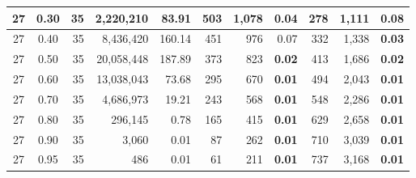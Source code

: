 \begin{table}[H]
\begin{tabular}{|c|c|r|r|r|r|r|r|r|r|r|}
        27                              & 0.30                              & 35                                     & 2,220,210                         & 83.91                             & 503           & 1,078            & \textbf{0.04} & 278           & 1,111            & 0.08          \\ \hline
        27                              & 0.40                              & 35                                     & 8,436,420                         & 160.14                            & 451           & 976              & 0.07          & 332           & 1,338            & \textbf{0.03} \\ \hline
        27                              & 0.50                              & 35                                     & 20,058,448                        & 187.89                            & 373           & 823              & \textbf{0.02} & 413           & 1,686            & \textbf{0.02} \\ \hline
        27                              & 0.60                              & 35                                     & 13,038,043                        & 73.68                             & 295           & 670              & \textbf{0.01} & 494           & 2,043            & \textbf{0.01} \\ \hline
        27                              & 0.70                              & 35                                     & 4,686,973                         & 19.21                             & 243           & 568              & \textbf{0.01} & 548           & 2,286            & \textbf{0.01} \\ \hline
        27                              & 0.80                              & 35                                     & 296,145                           & 0.78                              & 165           & 415              & \textbf{0.01} & 629           & 2,658            & \textbf{0.01} \\ \hline
        27                              & 0.90                              & 35                                     & 3,060                             & 0.01                              & 87            & 262              & \textbf{0.01} & 710           & 3,039            & \textbf{0.01} \\ \hline
        27                              & 0.95                              & 35                                     & 486                               & 0.01                              & 61            & 211              & \textbf{0.01} & 737           & 3,168            & \textbf{0.01} \\ \hline

\end{tabular}
\end{table}
